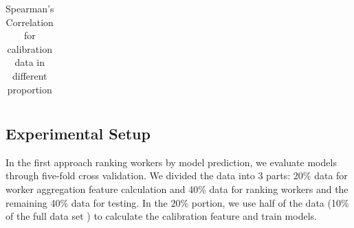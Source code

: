 \documentclass[11pt]{article}
\begin{document}
\begin{table}[t]
\begin{center}
\begin{tabular}{|c|c|c|c|c|c|c|}
\end{tabular}
\end{center}
\caption{\label{firstkbleu} Spearman's Correlation for calibration data in different proportion}
\end{table}

%






    
%
%
%
\subsection{Experimental Setup}
In the first approach ranking workers by model prediction, we evaluate models through five-fold cross validation. We divided the data into 3 parts: 20\% data for worker aggregation feature calculation and 40\% data for ranking workers and the remaining 40\% data for testing. In the 20\% portion, we use half of the data (10\% of the full data set ) to calculate the calibration feature and train  models. 
\end{document}
